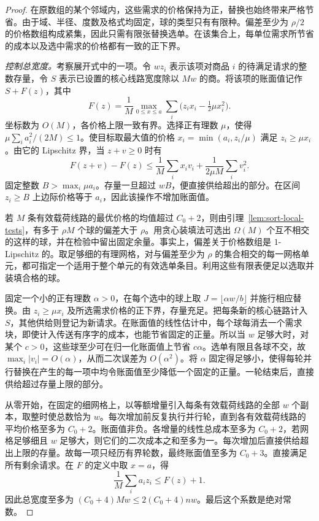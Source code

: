 \begin{proof}
在原数组的某个邻域内，这些需求的价格保持为正，替换也始终带来严格节省。由于域、半径、度数及格式均固定，球的类型只有有限种。偏差至少为 $\rho/2$ 的价格数组构成紧集，因此只需有限张替换选单。在该集合上，每单位需求所节省的成本以及选中需求的价格都有一致的正下界。

\smallskip\noindent \emph{控制总宽度。}考察展开式中的一项。令 $wz_i$ 表示该项对商品 $i$ 的待满足请求的整数存量，令 $S$ 表示已设置的核心线路宽度除以 $Mw$ 的商。将该项的账面值记作 $S+F(z)$，其中 \[
       F(z)=\frac1M\max_{0\le x\le a}
                   \sum_i\bigl(z_ix_i-\tfrac12\mu x_i^2\bigr).
\] 坐标数为 $O(M)$，各价格上限一致有界。选择正有理数 $\mu$，使得 $\mu\sum_i a_i^2/(2M)\le1$。使目标取最大值的价格 $x_i=\min(a_i,z_i/\mu)$ 满足 $z_i\ge\mu x_i$。由它的 Lipschitz 界，当 $z+v\ge0$ 时有 \[
       F(z+v)-F(z)
       \le \frac1M\sum_i x_iv_i+\frac1{2\mu M}\sum_i v_i^2 .
\] 固定整数 $B>\max_i\mu a_i$。存量一旦超过 $wB$，便直接供给超出的部分。在区间 $z_i\ge B$ 上边际价格等于 $a_i$，因此该操作不增加账面值。

若 $M$ 条有效载荷线路的最优价格的均值超过 $C_0+2$，则由引理~\ref{lem:sort-local-tests}，有多于 $\rho M$ 个球的偏差大于 $\rho$。用贪心装填法可选出 $\Omega(M)$ 个互不相交的这样的球，并在检验中留出固定余量。事实上，偏差关于价格数组是 $1$-Lipschitz 的。取足够细的有理网格，对与偏差至少为 $\rho$ 的集合相交的每一网格单元，都可指定一个适用于整个单元的有效选单条目。利用这些有限表便足以选取并装填合格的球。

固定一个小的正有理数 $\alpha>0$，在每个选中的球上取 $J=\lfloor\alpha w/b\rfloor$ 并施行相应替换。由 $z_i\ge\mu x_i$ 及所选需求价格的正下界，存量充足。把每条新的核心链路计入 $S$，其他供给则登记为新请求。在账面值的线性估计中，每个球每消去一个需求块，即使计入传送有序字的成本，也能节省固定的正量。所以当 $w$ 足够大时，对某个 $c>0$，这些球至少可在归一化账面值上节省 $c\alpha$。选单有限且各球不交，故 $\max_i|v_i|=O(\alpha)$，从而二次误差为 $O(\alpha^2)$。将 $\alpha$ 固定得足够小，使得每轮并行替换在产生的每一项中均令账面值至少降低一个固定的正量。一轮结束后，直接供给超过存量上限的部分。

从零开始，在固定的细网格上，以等额增量引入每条有效载荷线路的全部 $w$ 个副本，取整时使总数恰为 $w$。每次增加前反复执行并行轮，直到各有效载荷线路的平均价格至多为 $C_0+2$。账面值非负。各增量的线性总成本至多为 $C_0+2$，若网格足够细且 $w$ 足够大，则它们的二次成本之和至多为一。每次增加后直接供给超出上限的存量。故每一项只经历有界轮数，最终账面值至多为 $C_0+3$。直接满足所有剩余请求。在 $F$ 的定义中取 $x=a$，得 \[
             \frac1M\sum_i a_i z_i\le F(z)+1.
\] 因此总宽度至多为 $(C_0+4)Mw\le 2(C_0+4)nw$。最后这个系数是绝对常数。


\end{proof}
